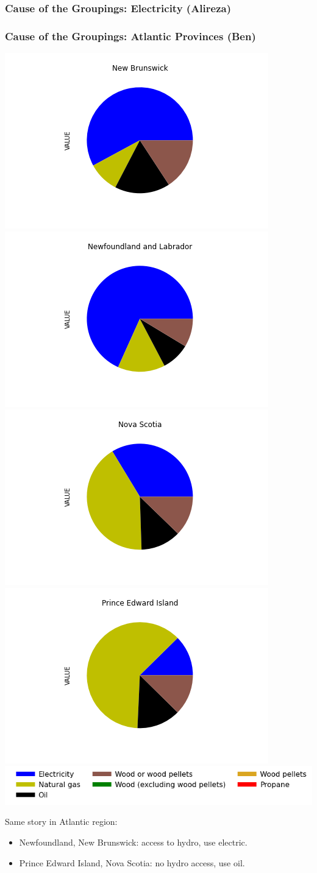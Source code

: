\documentclass{beamer}
\begin{document}
\begin{frame}
\frametitle{Cause of the Groupings: Electricity (Alireza)}

\end{frame}











\begin{frame}
\frametitle{Cause of the Groupings: Atlantic Provinces (Ben)}

\begin{center}
\includegraphics[width=0.25\linewidth, trim={120pt 50pt 110pt 10pt}, clip]{Ben_Images/NB.png}%
\includegraphics[width=0.25\linewidth, trim={120pt 50pt 110pt 10pt}, clip]{Ben_Images/NL.png}%
\includegraphics[width=0.25\linewidth, trim={120pt 50pt 110pt 10pt}, clip]{Ben_Images/NS.png}%
\includegraphics[width=0.25\linewidth, trim={120pt 50pt 110pt 10pt}, clip]{Ben_Images/PE.png}\\[10pt]
\includegraphics[width=0.8\linewidth]{leg_bar.png}
\end{center}

Same story in Atlantic region:
	\begin{itemize}
		\item Newfoundland, New Brunswick: access to hydro, use electric.
		\item Prince Edward Island, Nova Scotia: no hydro access, use oil.
	\end{itemize}

\end{frame}
\end{document}
